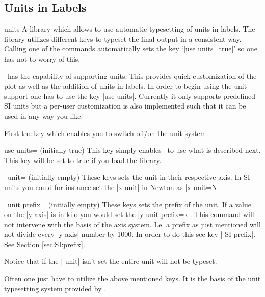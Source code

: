 \subsection{Units in Labels}
\label{sec:units}

\begin{pgfplotslibrary}{units}
	A library which allows to use automatic typesetting of units in labels. The library utilizes different keys to typeset the final output in a consistent way.
	Calling one of the commands automatically sets the key `|use units=true|' so one has not to worry of this.
\end{pgfplotslibrary}
 \PGFPlots\ has the capability of supporting units. This provides quick customization of the plot as well as the addition of units in labels. In order to
 begin using the unit support one has to use the key |use units|. Currently it only supports predefined SI units but a per-user customization is also
 implemented such that it can be used in any way you like.

 First the key which enables you to switch off/on the unit system.
\begin{pgfplotskey}{use units= (initially true)}
  This key simply enables \PGFPlots\ to use what is described next. This key will be set to true if you load the library.
\end{pgfplotskey}
\begin{pgfplotsxykey}{\x\ unit= (initially empty)}
  These keys sets the unit in their respective axis. In SI units you could for instance set the |x unit| in Newton as |x unit=N|.
\end{pgfplotsxykey}
\begin{pgfplotsxykey}{\x\ unit prefix= (initially empty)}
  These keys sets the prefix of the unit. If a value on the |y axis| is in kilo you would set the |y unit prefix=k|. This command will not intervene with
  the basis of the axis system. I.e. a prefix as just mentioned will not divide every |y axis| number by 1000. In order to do this see key | SI prefix|. See Section \ref{sec:SI:prefix}.
  
  Notice that if the | unit| isn't set the entire unit will not be typeset.
\end{pgfplotsxykey}
Often one just have to utilize the above mentioned keys. It is the basis of the unit typesetting system provided by \PGFPlots. 
\begin{codeexample}[]
\end{codeexample}

